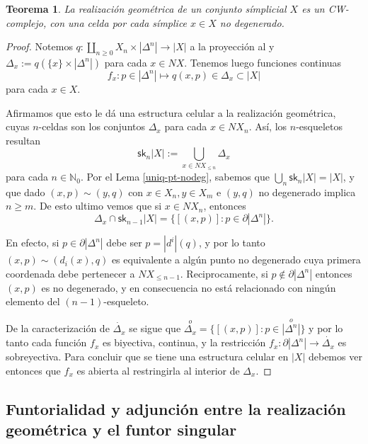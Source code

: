 \documentclass[11pt]{report}
\theoremstyle{colored}
\newtheorem{theorem}{Teorema}[section]
\newcommand{\N}{\mathbb{N}}
\newcommand{\tint}[1]{\stackrel{o}{#1}}
\newcommand{\sk}{\mathsf{sk}}
\renewcommand{\ss}[1]{\Delta^{#1}}
\begin{document}
\begin{tcolorbox}[colupper=black,colback=red!20,colframe=white]
\begin{theorem} La realización geométrica de un conjunto símplicial $X$ es un CW-complejo, con una celda por cada símplice $x \in X$ no degenerado.
\end{theorem}
\begin{proof} Notemos $q : \coprod_{n \geq 0} X_n \times |\ss{n}| \to |X|$ a la proyección al y $\Delta_x := q(\{x\} \times |\ss{n}|)$ para cada $x \in NX$. Tenemos luego funciones continuas
\[
f_x : p \in |\ss{n}| \mapsto q(x,p) \in \Delta_x \subset |X|
\]
para cada $x \in X$. 

Afirmamos que esto le dá una estructura celular a la realización geométrica, cuyas $n$-celdas son los conjuntos $\Delta_x$ para cada $x \in NX_n$. Así, los $n$-esqueletos resultan
\[
\sk_n |X| := \bigcup_{x \in NX_{\leq n}}\Delta_x
\]
para cada $n \in \N_0$. Por el Lema \ref{uniq-pt-nodeg}, sabemos que $\bigcup_n \sk_n|X| = |X|$, y que dado $(x,p) \sim (y,q)$ con $x \in X_n, y \in X_m$ e $(y,q)$ no degenerado implica $n \geq m$. De esto ultimo vemos que si $x \in NX_n$, entonces
\[
\Delta_x \cap \sk_{n-1}|X| = \{[(x,p)] : p \in \partial|\ss{n}|\}.
\]

En efecto, si $p \in \partial|\ss{n}|$ debe ser $p = |d^i|(q)$, y por lo tanto $(x,p) \sim (d_i(x),q)$ es equivalente a algún punto no degenerado cuya primera coordenada debe pertenecer a $NX_{\leq n-1}$. Reciprocamente, si $p \not \in \partial|\ss{n}|$ entonces $(x,p)$ es no degenerado, y en consecuencia no está relacionado con ningún elemento del $(n-1)$-esqueleto.

De la caracterización de $\dot{\Delta_x}$ se sigue que $\tint{\Delta_x} = \{ [(x,p)] : p \in \tint{|\ss{n}|}\}$ y por lo tanto cada función $f_x$ es biyectiva, continua, y la restricción $f_x : \partial|\ss{n}| \to \dot{\Delta_x}$ es sobreyectiva. Para concluir que se tiene una estructura celular en $|X|$ debemos ver entonces que $f_x$ es abierta al restringirla al interior de $\Delta_x$.  
\end{proof}
\end{tcolorbox}

\subsection{Funtorialidad y adjunción entre la realización geométrica y el funtor singular}
\end{document}
